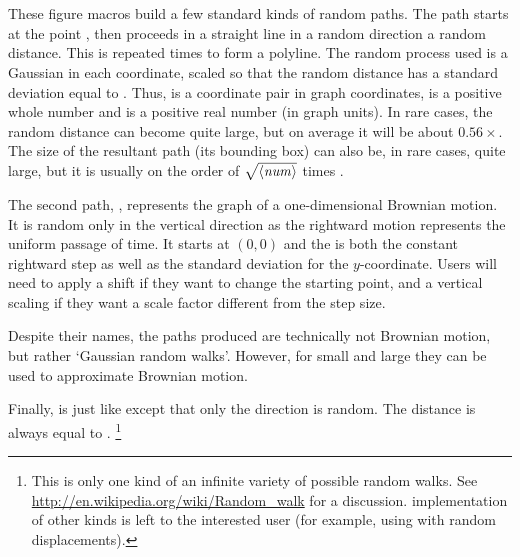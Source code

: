 \documentclass[letterpaper]{article}
\begin{document}
\begin{cd}
\\%
\\%
%
%
%
\end{cd}

These figure macros build a few standard kinds of random paths. The
 path starts at the point , then proceeds
in a straight line in a random direction a random distance. This is
repeated  times to form a polyline. The random process used is
a Gaussian in each coordinate, scaled so that the random distance has a
standard deviation equal to . Thus,  is a
coordinate pair in graph coordinates,  is a positive whole
number and  is a positive real number (in graph units). In
rare cases, the random distance can become quite large, but on average
it will be about $0.56\times{}$. The size of the resultant
path (its bounding box) can also be, in rare cases, quite large, but it
is usually on the order of $\sqrt{\langle\mbox{\rmfamily\itshape num\/}\rangle}$ times .

The second path, , represents the graph of a
one-dimensional Brownian motion. It is random only in the vertical
direction as the rightward motion represents the uniform passage of
time. It starts at $(0,0)$ and the  is both the constant
rightward step as well as the standard deviation for the $y$-coordinate.
Users will need to apply a shift if they want to change the starting
point, and a vertical scaling if they want a scale factor different from
the step size.

Despite their names, the paths produced are technically not Brownian
motion, but rather `Gaussian random walks'. However, for small
 and large  they can be used to approximate
Brownian motion.

Finally,  is just like  except that
only the direction is random. The distance is always equal to
.%
    \footnote{This is only one kind of an infinite variety of possible
    random walks. See \url{http://en.wikipedia.org/wiki/Random_walk} for a
    discussion. \Mfp{} implementation of other kinds is left to the
    interested user (for example, using  with random
    displacements).}
\end{document}
